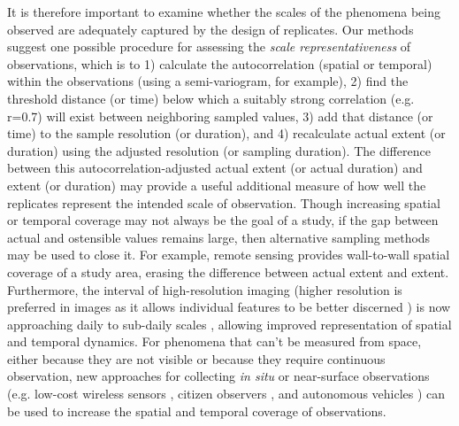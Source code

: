 \documentclass[12pt]{article}
\begin{document}
It is therefore important to examine whether the scales of the phenomena being observed are adequately captured by the design of replicates. Our methods suggest one possible procedure for assessing the \emph{scale representativeness} of observations, which is to 1) calculate the autocorrelation (spatial or temporal) within the observations (using a semi-variogram, for example), 2) find the threshold distance (or time) below which a suitably strong correlation (e.g. r=0.7) will exist between neighboring sampled values, 3) add that distance (or time) to the sample resolution (or duration), and 4) recalculate actual extent (or duration) using the adjusted resolution (or sampling duration). The difference between this autocorrelation-adjusted actual extent (or actual duration) and extent (or duration) may provide a useful additional measure of how well the replicates represent the intended scale of observation. Though increasing spatial or temporal coverage may not always be the goal of a study, if the gap between actual and ostensible values remains large, then alternative sampling methods may be used to close it. For example, remote sensing provides wall-to-wall spatial coverage of a study area, erasing the difference between actual extent and extent. Furthermore, the interval of high-resolution imaging (higher resolution is preferred in images as it allows individual features to be better discerned \cite{dark_modifiable_2007, hay_comparison_2003}) is now approaching daily to sub-daily scales \cite{drusch_sentinel-2:_2012, hand_startup_2015}, allowing improved representation of spatial and temporal dynamics. For phenomena that can't be measured from space, either because they are not visible or because they require continuous observation, new approaches for collecting \emph{in situ} or near-surface observations (e.g. low-cost wireless sensors \cite{wolf_gsm-based_2012, collins_new_2006, porter_wireless_2005}, citizen observers \cite{dickinson_current_2012}, and autonomous vehicles \cite{anderson_lightweight_2013}) can be used to increase the spatial and temporal coverage of observations.
\end{document}
